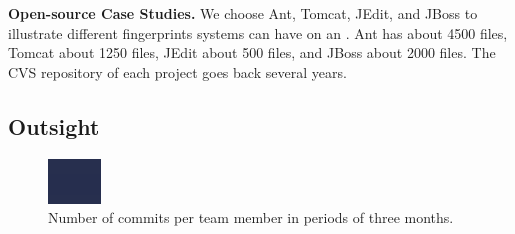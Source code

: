 \textbf{Open-source Case Studies.} We choose Ant, Tomcat, JEdit, and JBoss to illustrate different fingerprints systems can have on an \omap. Ant has about 4500 files, Tomcat about 1250 files, JEdit about 500 files, and JBoss about 2000 files. The CVS repository of each project goes back several years.

\subsection{Outsight}\label{sec:outsight}
\begin{figure}[htbp]
\begin{center}
\includegraphics[width=\columnwidth]{commit-histogram}
\caption{Number of commits per team member in periods of three months.}
\label{fig:histogram}
\end{center}
\end{figure}

